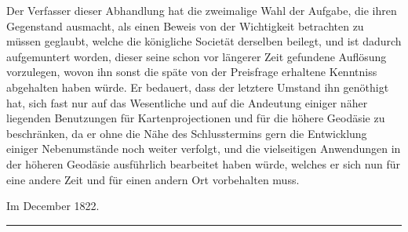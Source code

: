 Der Verfasser dieser Abhandlung hat die zweimalige Wahl der Aufgabe, die ihren Gegenstand ausmacht, als einen Beweis von der Wichtigkeit betrachten zu müssen geglaubt, welche die königliche Societät derselben beilegt, und ist dadurch aufgemuntert worden, dieser seine schon vor längerer Zeit gefundene Auflösung vorzulegen, wovon ihn sonst die späte von der Preisfrage erhaltene Kenntniss abgehalten haben würde. Er bedauert, dass der letztere Umstand ihn genöthigt hat, sich fast nur auf das Wesentliche und auf die Andeutung einiger näher liegenden Benutzungen für Kartenprojectionen und für die höhere Geodäsie zu beschränken, da er ohne die Nähe des Schlusstermins gern die Entwicklung einiger Nebenumstände noch weiter verfolgt, und die vielseitigen Anwendungen in der höheren Geodäsie ausführlich bearbeitet haben würde, welches er sich nun für eine andere Zeit und für einen andern Ort vorbehalten muss.

Im December 1822.
\begin{center}\rule{.3\linewidth}{.3pt}\end{center}
\clearpage
